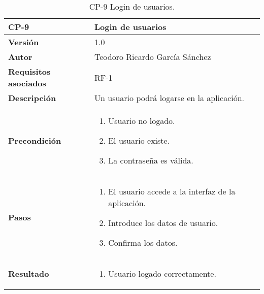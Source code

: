 \begin{table}[p]
	\centering
	\begin{tabularx}{\linewidth}{ p{} p{} }
		\toprule
		\textbf{CP-9}    & \textbf{Login de usuarios}\\
		\toprule
		\textbf{Versión}              & 1.0    \\
		\textbf{Autor}                & Teodoro Ricardo García Sánchez \\
		\textbf{Requisitos asociados} & RF-1 \\
		\textbf{Descripción}          & Un usuario podrá logarse en la aplicación. \\
		\textbf{Precondición}         & 
		\begin{enumerate}
			\def\labelenumi{\arabic{enumi}.}
			\tightlist
			\item Usuario no logado.
			\item El usuario existe.
			\item La contraseña es válida.
		\end{enumerate}\\
		\textbf{Pasos}             &
		\begin{enumerate}
			\def\labelenumi{\arabic{enumi}.}
			\tightlist
			\item El usuario accede a la interfaz de la aplicación.
			\item Introduce los datos de usuario.
			\item Confirma los datos.
		\end{enumerate}\\
		\textbf{Resultado}          & 
		\begin{enumerate}
			\item Usuario logado correctamente.
		\end{enumerate}\\
		\bottomrule
	\end{tabularx}
	\caption{CP-9 Login de usuarios.}
\end{table}

